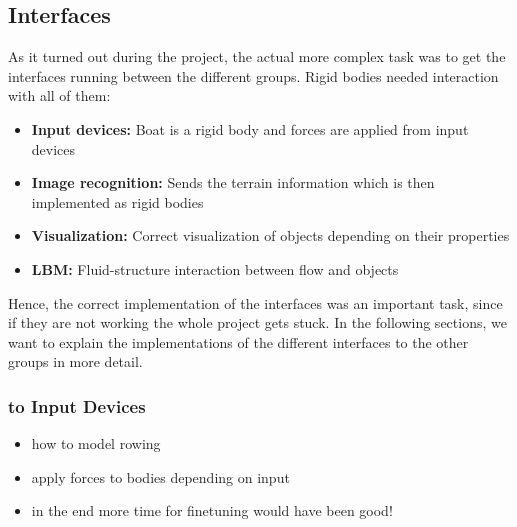 \subsection{Interfaces}
As it turned out during the project, the actual more complex task was to get the interfaces running between the different groups. Rigid bodies needed interaction with all of them:
\begin{itemize}
\item \textbf{Input devices:} Boat is a rigid body and forces are applied from input devices
\item \textbf{Image recognition:} Sends the terrain information which is then implemented as rigid bodies
\item \textbf{Visualization:} Correct visualization of objects depending on their properties
\item \textbf{LBM:} Fluid-structure interaction between flow and objects
\end{itemize}
Hence, the correct implementation of the interfaces was an important task, since if they are not working the whole project gets stuck. In the following sections, we want to explain the implementations of the different interfaces to the other groups in more detail.
\subsubsection{to Input Devices}
\begin{itemize}
\item how to model rowing
\item apply forces to bodies depending on input
\item in the end more time for finetuning would have been good!
\end{itemize}
